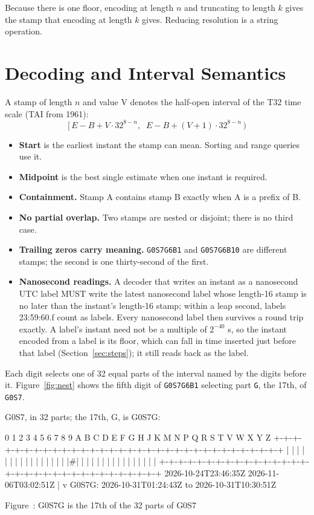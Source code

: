 \documentclass[11pt]{article}
\newcommand{\lit}[1]{\texttt{#1}}
\newcommand{\pow}[2]{\ensuremath{#1^{#2}}}
\newcommand{\Sec}[1]{Section~\ref{#1}}
\newcounter{rfcfig}
\newcommand{\figcap}[2]{\refstepcounter{rfcfig}\label{#1}{\centering\small Figure~\therfcfig: #2\par}}
\newcommand{\Fig}[1]{Figure~\ref{#1}}
\begin{document}
Because there is one floor, encoding at length $n$ and truncating to length
$k$ gives the stamp that encoding at length $k$ gives. Reducing resolution is
a string operation.

\section{Decoding and Interval Semantics}\label{sec:decoding}

A stamp of length $n$ and value V denotes the half-open interval of the T32
time scale (TAI from 1961):
\[
\bigl[\, E - B + V \cdot 32^{8-n},\;\; E - B + (V+1) \cdot 32^{8-n} \,\bigr)
\]

\begin{itemize}
\item \textbf{Start} is the earliest instant the stamp can mean. Sorting and
range queries use it.
\item \textbf{Midpoint} is the best single estimate when one instant is
required.
\item \textbf{Containment.} Stamp A contains stamp B exactly when A is a prefix
of B.
\item \textbf{No partial overlap.} Two stamps are nested or disjoint; there is
no third case.
\item \textbf{Trailing zeros carry meaning.} \lit{G0S7G6B1} and
\lit{G0S7G6B10} are different stamps; the second is one thirty-second of the
first.
\item \textbf{Nanosecond readings.} A decoder that writes an instant as a
nanosecond UTC label MUST write the latest nanosecond label whose length-16
stamp is no later than the instant's length-16 stamp; within a leap second,
labels 23:59:60.f count as labels. Every nanosecond label then survives a
round trip exactly. A label's instant need not be a multiple of \pow{2}{-40}
s, so the instant encoded from a label is its floor, which can fall in time
inserted just before that label (\Sec{sec:steps}); it still reads back as the
label.
\end{itemize}

Each digit selects one of 32 equal parts of the interval named by the digits
before it. \Fig{fig:nest} shows the fifth digit of \lit{G0S7G6B1} selecting
part \lit{G}, the 17th, of \lit{G0S7}.

\begin{code}
G0S7, in 32 parts; the 17th, G, is G0S7G:

 0 1 2 3 4 5 6 7 8 9 A B C D E F G H J K M N P Q R S T V W X Y Z
+-+-+-+-+-+-+-+-+-+-+-+-+-+-+-+-+-+-+-+-+-+-+-+-+-+-+-+-+-+-+-+-+
| | | | | | | | | | | | | | | | |#| | | | | | | | | | | | | | | |
+-+-+-+-+-+-+-+-+-+-+-+-+-+-+-+-+-+-+-+-+-+-+-+-+-+-+-+-+-+-+-+-+
2026-10-24T23:46:35Z                         2026-11-06T03:02:51Z
                                 |
                                 v
G0S7G: 2026-10-31T01:24:43Z to 2026-10-31T10:30:51Z
\end{code}
\figcap{fig:nest}{G0S7G is the 17th of the 32 parts of G0S7}
\end{document}
